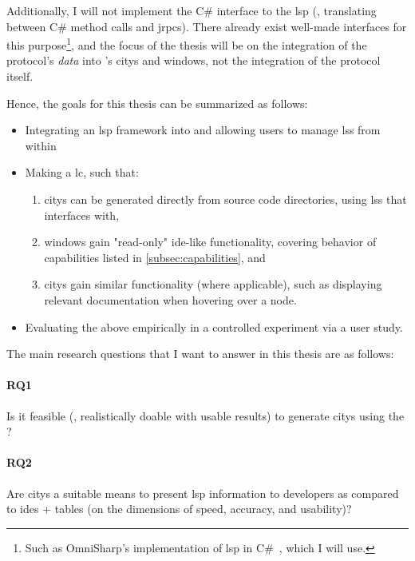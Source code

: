 \documentclass[../thesis]{subfiles}
\begin{document}
Additionally, I will not implement the C\# interface to the \gls{lsp} (\ie, translating between C\# method calls and \glspl{jrpc}).
There already exist well-made interfaces for this purpose\footnote{
	Such as OmniSharp's implementation of \gls{lsp} in C\#~\cite{csharplanguageserverprotocol2023}, which I will use.
}, and the focus of the thesis will be on the integration of the protocol's \emph{data} into \SEE{}'s \glspl{city} and \glspl{window}, not the integration of the protocol itself.

Hence, the goals for this thesis can be summarized as follows:
\begin{itemize}
	\item Integrating an \gls{lsp} framework into \SEE{} and allowing users to manage \glspl{ls} from within \SEE{}
	\item Making \SEE{} a \gls{lc}, such that:
	      \begin{enumerate}
		      \item \Glspl{city} can be generated directly from source code directories, using \glspl{ls} that \SEE{} interfaces with,
		      \item \Glspl{window} gain "read-only" \gls{ide}-like functionality, covering behavior of capabilities listed in \cref{subsec:capabilities}, and
		      \item \Glspl{city} gain similar functionality (where applicable), such as displaying relevant documentation when hovering over a node.
	      \end{enumerate}
	\item Evaluating the above empirically in a controlled experiment via a user study.
\end{itemize}

The main research questions that I want to answer in this thesis are as follows:
\vspace{-1.5em}
\paragraph{RQ1}
Is it feasible (\ie, realistically doable with usable results) to generate \mbox{\glspl{city}} using the \mbox{}?
\vspace{-1.5em}
\paragraph{RQ2}
Are \glspl{city} a suitable means to present \gls{lsp} information to developers as compared to \glspl{ide} + tables (on the dimensions of speed, accuracy, and usability)?
\end{document}

